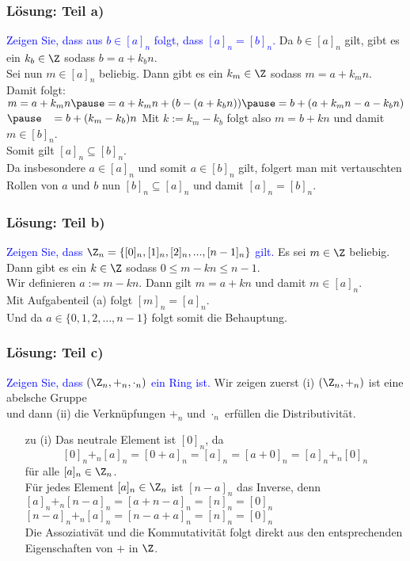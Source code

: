 %
\begin{frame}\frametitle{Lösung: Teil a)}
%
\textcolor{blue}{Zeigen Sie, dass aus $b \in [a]_n$ folgt, dass $[a]_n=[b]_n$.}
%
\vfill
Da $b \in [a]_n$ gilt, gibt es ein $k_b\in \Z$ sodass $b=a+k_b n$.\\ \pause
Sei nun $m \in [a]_n$ beliebig. Dann gibt es ein $k_m \in \Z$ sodass $m=a+k_m n$. Damit folgt: \pause
\vfill
$
m=a+k_m n \pause= a+k_m n + (b- (a+k_b n))\pause=b + (a+k_m n -a- k_b n)$\\$ \pause \hspace{3mm}=b + (k_m-k_b)n
$\pause
\vfill
Mit $k:=k_m -k_b$ folgt also $m=b+kn$ und damit $m \in [b]_n$. \\Somit gilt $[a]_n \subseteq [b]_n$.\\\pause
Da insbesondere $a \in [a]_n$ und somit $a\in [b]_n$ gilt, folgert man mit vertauschten Rollen von $a$ und $b$ nun $[b]_n \subseteq [a]_n$ und damit $[a]_n=[b]_n$.

\end{frame}
%
%
\begin{frame}\frametitle{Lösung: Teil b)}
%
\textcolor{blue}{Zeigen Sie, dass $\Z_n=\{[0]_n,[1]_n,[2]_n,...,[n-1]_n\}$ gilt.}
%
\vfill
Es sei $m \in \Z$ beliebig. \\ \pause
Dann gibt es ein $k \in \Z$ sodass $0\le m-kn \le n-1$.\\ \pause
Wir definieren $a:=m-kn$. Dann gilt $m=a+kn$ und damit $m \in [a]_n$.\\ \pause
Mit Aufgabenteil (a) folgt $[m]_n=[a]_n$.\\ \pause
Und da $a \in \{0,1,2,...,n-1\}$ folgt somit die Behauptung.
	
\end{frame}
%
%
\begin{frame}\frametitle{Lösung: Teil c)}
%
\textcolor{blue}{Zeigen Sie, dass $(\Z_n,+_n,\cdot_n)$ ein Ring ist.} \pause
%
\vfill
Wir zeigen zuerst 
(i) $(\Z_n,+_n)$ ist eine abelsche Gruppe\\ und dann 
(ii) die Verkn\"upfungen $+_n$ und $\cdot_n$ erf\"ullen die Distributivit\"at. \pause
\vfill
\begin{itemize}
\item[zu (i)]
Das neutrale Element ist $[0]_n$, da 
$$[0]_n+_n[a]_n=[0+a]_n=[a]_n=[a+0]_n=[a]_n+_n[0]_n$$
f\"ur alle $[a]_n \in \Z_n$.\\ \pause
F\"ur jedes Element $[a]_n \in \Z_n$ ist $[n-a]_n$ das Inverse, denn \\
\vspace{1mm}
$[a]_n+_n[n-a]_n=[a+n-a]_n=[n]_n=[0]_n$\\
$[n-a]_n+_n[a]_n=[n-a+a]_n=[n]_n=[0]_n$\\\pause
\vspace{1mm}
Die Assoziativ\"at und die Kommutativit\"at folgt direkt aus den entsprechenden Eigenschaften von $+$ in $\Z$.

\end{itemize}

\end{frame}
